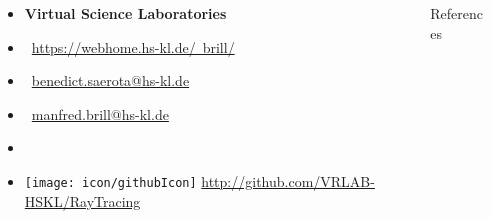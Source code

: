 \documentclass[final,hyperref={pdfpagelabels=false}]{beamer}
\begin{document}
\begin{frame}[t]
\begin{columns}
\begin{column}{0.325\textwidth}
\begin{itemize}
\item[] \textbf{\large Virtual Science Laboratories}
\item[] \faGlobe\ \href{https://webhome.hs-kl.de/~brill/}{https://webhome.hs-kl.de/~brill/} 
\item[] \Letter\ \href{benedict.saerota@hs-kl.de}{benedict.saerota@hs-kl.de}
\item[] \Letter\ \href{manfred.brill@hs-kl.de}{manfred.brill@hs-kl.de}
\item[]
\item[] \texttt{[image: icon/githubIcon]} \href{https://github.com/VRLAB-HSKL/RayTracing}{http://github.com/VRLAB-HSKL/RayTracing}

\end{itemize}
\end{column}


\begin{column}{0.465\textwidth}
\nocite{*}
\begin{block}{References}
 
 \nocite{pries:19}
 
\end{block}
\end{column}

\begin{column}{0.025\textwidth}\end{column} %


\end{columns}

\end{frame} %
\end{document}
